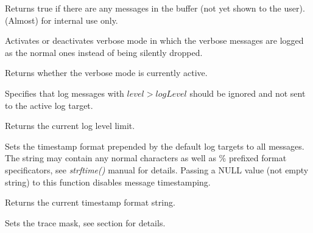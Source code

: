 
Returns true if there are any messages in the buffer (not yet shown to the
user). (Almost) for internal use only.

\label{wxlogsetverbose}


Activates or deactivates verbose mode in which the verbose messages are
logged as the normal ones instead of being silently dropped.

\label{wxloggetverbose}


Returns whether the verbose mode is currently active.

\label{wxlogsetloglevel}


Specifies that log messages with $level > logLevel$ should be ignored
and not sent to the active log target.

\label{wxloggetloglevel}


Returns the current log level limit.

\label{wxlogsettimestamp}


Sets the timestamp format prepended by the default log targets to all
messages. The string may contain any normal characters as well as \%
prefixed format specificators, see {\it strftime()} manual for details.
Passing a NULL value (not empty string) to this function disables message timestamping.

\label{wxloggettimestamp}


Returns the current timestamp format string.

\label{wxlogsettracemask}


Sets the trace mask, see 
section for details.

